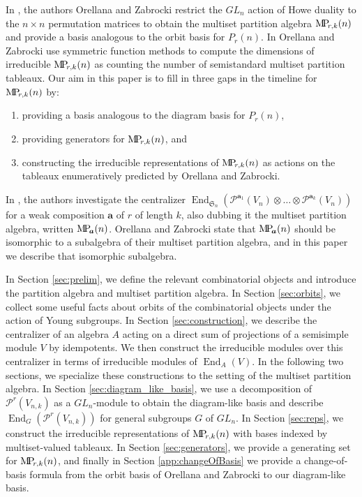 \documentclass[ALCO,Unicode,published]{cedram}
\newcommand{\PP}{\mathcal{P}}
\newcommand{\SG}{\mathfrak{S}}
\newcommand{\bfa}{{\boldsymbol{a}}}
\newcommand{\MP}{{\rm M\!P\!}}
\DeclareMathOperator{\End}{End}
\begin{document}
In \cite{orellana2020howe}, the authors Orellana and Zabrocki restrict the $GL_n$ action of Howe duality to the $n\times n$ permutation matrices to obtain the multiset partition algebra $\MP_{r,k}(n)$ and provide a basis analogous to the orbit basis for $P_r(n)$. In \cite{orellana2020combinatorial,orellana2020howe} Orellana and Zabrocki use symmetric function methods to compute the dimensions of irreducible $\MP_{r,k}(n)$ as counting the number of semistandard multiset partition tableaux. Our aim in this paper is to fill in three gaps in the timeline for $\MP_{r,k}(n)$ by:
\begin{enumerate}
    \item[(a)] providing a basis analogous to the diagram basis for $P_r(n)$,
    \item[(b)] providing generators for $\MP_{r,k}(n)$, and
    \item[(c)] constructing the irreducible representations of $\MP_{r,k}(n)$ as actions on the tableaux enumeratively predicted by Orellana and Zabrocki.
\end{enumerate}

In \cite{narayanan}, the authors investigate the centralizer $\End_{\SG_n}(\PP^{\bfa_1}(V_n)\otimes\dots\otimes \PP^{\bfa_k}(V_n))$ for a weak composition $\bfa$ of $r$ of length $k$, also dubbing it the multiset partition algebra, written $\MP_\bfa(n)$. Orellana and Zabrocki state that $\MP_\bfa(n)$ should be isomorphic to a subalgebra of their multiset partition algebra, and in this paper we describe that isomorphic subalgebra.

In Section \ref{sec:prelim}, we define the relevant combinatorial objects and introduce the partition algebra and multiset partition algebra. In Section \ref{sec:orbits}, we collect some useful facts about orbits of the combinatorial objects under the action of Young subgroups. In Section \ref{sec:construction}, we describe the centralizer of an algebra $A$ acting on a direct sum of projections of a semisimple module $V$ by idempotents. We then construct the irreducible modules over this centralizer in terms of irreducible modules of $\End_A(V)$. In the following two sections, we specialize these constructions to the setting of the multiset partition algebra. In Section \ref{sec:diagram_like_basis}, we use a decomposition of $\PP^r(V_{n,k})$ as a $GL_n$-module to obtain the diagram-like basis and describe $\End_G(\PP^r(V_{n,k}))$ for general subgroups $G$ of $GL_n$. In Section \ref{sec:reps}, we construct the irreducible representations of $\MP_{r,k}(n)$ with bases indexed by multiset-valued tableaux. In Section \ref{sec:generators}, we provide a generating set for $\MP_{r,k}(n)$, and finally in Section \ref{app:changeOfBasis} we provide a change-of-basis formula from the orbit basis of Orellana and Zabrocki to our diagram-like basis.
\end{document}
